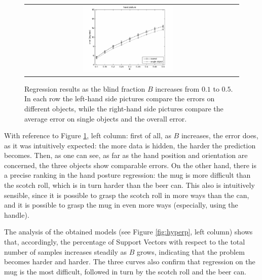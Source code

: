 \begin{figure}[htbp]
\begin{center}
\begin{tabular}{cc}
      \includegraphics[width=0.45\textwidth]{error_cmp_pst.eps} \\
    \end{tabular}
    \caption{Regression results as the blind fraction $B$ increases
    from $0.1$ to $0.5$. In each row the
    left-hand side pictures compare the errors on different objects,
    while the right-hand side pictures compare the average error on
    single objects and the overall error.}
    \label{fig:err_all}
  \end{center}
\end{figure}

With reference to Figure \ref{fig:err_all}, left column: first of all, as $B$
increases, the error does, as it was intuitively expected: the more
data is hidden, the harder the prediction becomes. Then, as one can
see, as far as the hand position and orientation are concerned, the
three objects show comparable errors. On the other hand, there is a
precise ranking in the hand posture regression: the mug is more
difficult than the scotch roll, which is in turn harder than the beer
can. This also is intuitively sensible, since it is possible to grasp
the scotch roll in more ways than the can, and it is possible to grasp
the mug in even more ways (especially, using the handle).

The analysis of the obtained models (see Figure
\ref{fig:hyperp}, left column) shows that, accordingly, the percentage
of Support Vectors with respect to the total number of samples
increases steadily as $B$ grows, indicating that the problem becomes
harder and harder. The three curves also confirm that regression on
the mug is the most difficult, followed in turn by the scotch roll and
the beer can.


